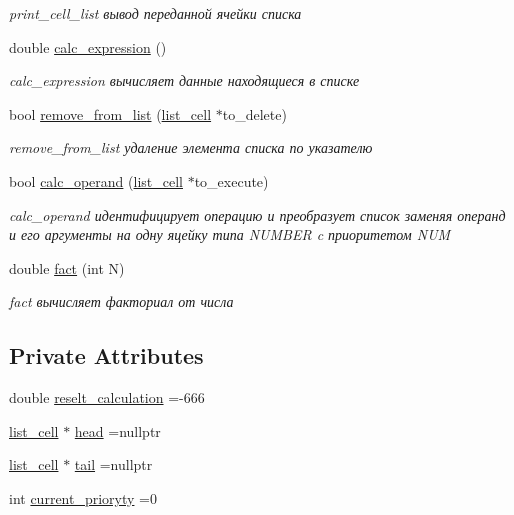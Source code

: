 \begin{DoxyCompactItemize}
\begin{DoxyCompactList}\small\item\em print\+\_\+cell\+\_\+list вывод переданной ячейки списка \end{DoxyCompactList}\item 
double \hyperlink{classRecognizer_a5f7a4de41baedf869d852ffd1cafdc06}{calc\+\_\+expression} ()
\begin{DoxyCompactList}\small\item\em calc\+\_\+expression вычисляет данные находящиеся в списке \end{DoxyCompactList}\item 
bool \hyperlink{classRecognizer_ab5630edfbf00dec3cd5f2a72aebd6ecb}{remove\+\_\+from\+\_\+list} (\hyperlink{structlist__cell}{list\+\_\+cell} $\ast$to\+\_\+delete)
\begin{DoxyCompactList}\small\item\em remove\+\_\+from\+\_\+list удаление элемента списка по указателю \end{DoxyCompactList}\item 
bool \hyperlink{classRecognizer_afc466411f799b54fc7c3e5c8875d78af}{calc\+\_\+operand} (\hyperlink{structlist__cell}{list\+\_\+cell} $\ast$to\+\_\+execute)
\begin{DoxyCompactList}\small\item\em calc\+\_\+operand идентифицирует операцию и преобразует список заменяя операнд и его аргументы на одну яцейку типа N\+U\+M\+B\+E\+R c приоритетом N\+U\+M \end{DoxyCompactList}\item 
double \hyperlink{classRecognizer_a68bb9a9f6b35666d4bf153691cc83294}{fact} (int N)
\begin{DoxyCompactList}\small\item\em fact вычисляет факториал от числа \end{DoxyCompactList}\end{DoxyCompactItemize}
\subsection*{Private Attributes}
\begin{DoxyCompactItemize}
\item 
double \hyperlink{classRecognizer_a6b70dee4d16fa7a8dfa6a20ed51619c0}{reselt\+\_\+calculation} =-\/666
\item 
\hyperlink{structlist__cell}{list\+\_\+cell} $\ast$ \hyperlink{classRecognizer_a57472dc57c50868b264c1aad83499e8c}{head} =nullptr
\item 
\hyperlink{structlist__cell}{list\+\_\+cell} $\ast$ \hyperlink{classRecognizer_a123b3de09c7231ee0344328732fa5e13}{tail} =nullptr
\item 
int \hyperlink{classRecognizer_a64d6c41524ae1269968052d3af172221}{current\+\_\+prioryty} =0
\end{DoxyCompactItemize}


